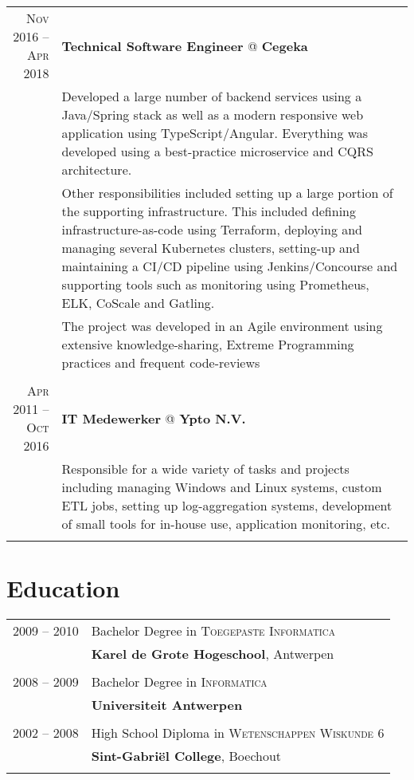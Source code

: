 \documentclass[a4paper,10pt]{article}
\begin{document}
\begin{tabular}{r|p{11cm}}
	
	\textsc{Nov 2016 – Apr 2018} & \textbf{Technical Software Engineer} @ \textbf{Cegeka} \\ 
	& \footnotesize{Developed a large number of backend services using a Java/Spring stack as well as a modern responsive web application using TypeScript/Angular. Everything was developed using a best-practice microservice and CQRS architecture.}\\
	& \footnotesize{Other responsibilities included setting up a large portion of the supporting infrastructure. This included defining infrastructure-as-code using Terraform, deploying and managing several Kubernetes clusters, setting-up and maintaining a CI/CD pipeline using Jenkins/Concourse and supporting tools such as monitoring using Prometheus, ELK, CoScale and Gatling.}\\
	& \footnotesize{The project was developed in an Agile environment using extensive knowledge-sharing, Extreme Programming practices and frequent code-reviews}\\
	\multicolumn{2}{c}{} \\

        
	\textsc{Apr 2011 – Oct 2016} & \textbf{IT Medewerker} @ \textbf{Ypto N.V.} \\
	& \footnotesize{Responsible for a wide variety of tasks and projects including managing Windows and Linux systems, custom ETL jobs, setting up log-aggregation systems, development of small tools for in-house use, application monitoring, etc.} \\
	\multicolumn{2}{c}{} \\
\end{tabular}

\section{\textcolor{awesome-red}{Edu}cation}
\begin{tabular}{rl}	
2009 – 2010& Bachelor Degree in \textsc{Toegepaste Informatica}\\
&\normalsize\textbf{Karel de Grote Hogeschool}, Antwerpen\\&\\
2008 – 2009& Bachelor Degree in \textsc{Informatica}\\
&\normalsize\textbf{Universiteit Antwerpen}\\&\\
2002 – 2008& High School Diploma in \textsc{Wetenschappen Wiskunde 6}\\
&\normalsize\textbf{Sint-Gabriël College}, Boechout\\&\\
\end{tabular}
\end{document}
